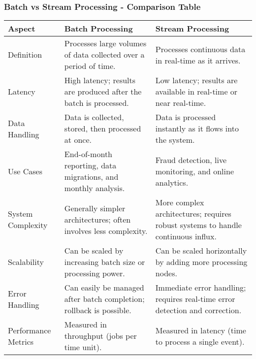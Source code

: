 \documentclass{beamer}
\begin{document}
\begin{frame}[fragile]
    \frametitle{Batch vs Stream Processing - Comparison Table}
    \begin{table}[]
        \centering
        \begin{tabular}{|l|l|l|}
            \hline
            \textbf{Aspect}            & \textbf{Batch Processing}                           & \textbf{Stream Processing}                           \\ \hline
            Definition         & Processes large volumes of data collected over a period of time. & Processes continuous data in real-time as it arrives. \\ \hline
            Latency            & High latency; results are produced after the batch is processed.          & Low latency; results are available in real-time or near real-time.          \\ \hline
            Data Handling       & Data is collected, stored, then processed at once.          & Data is processed instantly as it flows into the system.           \\ \hline
            Use Cases          & End-of-month reporting, data migrations, and monthly analysis.          & Fraud detection, live monitoring, and online analytics.           \\ \hline
            System Complexity   & Generally simpler architectures; often involves less complexity.          & More complex architectures; requires robust systems to handle continuous influx. \\ \hline
            Scalability        & Can be scaled by increasing batch size or processing power.         & Can be scaled horizontally by adding more processing nodes.          \\ \hline
            Error Handling     & Can easily be managed after batch completion; rollback is possible.   & Immediate error handling; requires real-time error detection and correction. \\ \hline
            Performance Metrics & Measured in throughput (jobs per time unit).         & Measured in latency (time to process a single event).         \\ \hline
        \end{tabular}
    \end{table}
\end{frame}
\end{document}
